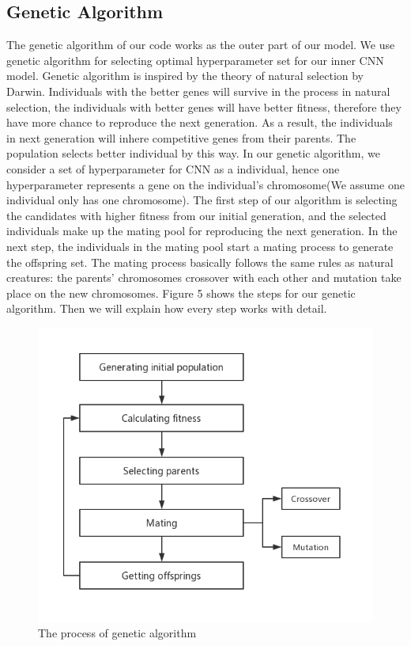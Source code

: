 \documentclass[12pt]{article}
\begin{document}
\subsection{Genetic Algorithm}
The genetic algorithm of our code works as the outer part of our model. We use genetic algorithm for selecting optimal hyperparameter set for our inner CNN model. Genetic algorithm is inspired by the theory of natural selection by Darwin. Individuals with the better genes will survive in the process in natural selection, the individuals with better genes will have better fitness, therefore they have more chance to reproduce the next generation. As a result, the individuals in next generation will inhere competitive genes from their parents. The population selects better individual by this way. In our genetic algorithm, we consider a set of hyperparameter for CNN as a individual, hence one hyperparameter represents a gene on the individual's chromosome(We assume one individual only has one chromosome). The first step of our algorithm is selecting the candidates with higher fitness from our initial generation, and the selected individuals make up the mating pool for reproducing the next generation. In the next step, the individuals in the mating pool start a mating process to generate the offspring set. The mating process basically follows the same rules as natural creatures: the parents' chromosomes crossover with each other and mutation take place on the new chromosomes. Figure 5 shows the steps for our genetic algorithm. Then we will explain how every step works with detail.\\
\begin{figure}
\begin{center}
\includegraphics[width =4.7in]{GA.png}
\caption{The process of genetic algorithm}
\end{center}
\label{fig:pic5}
\end{figure}
\end{document}
